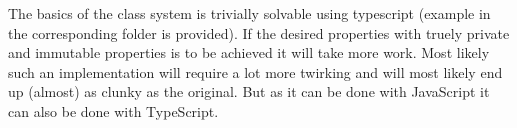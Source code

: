 The basics of the class system is trivially solvable using typescript
(example in the corresponding folder is provided). If the desired
properties with truely private and immutable properties is to be
achieved it will take more work.  Most likely such an
implementation will require a lot more twirking and will most likely
end up (almost) as clunky as the original.  But as it can be done with
JavaScript it can also be done with TypeScript.
